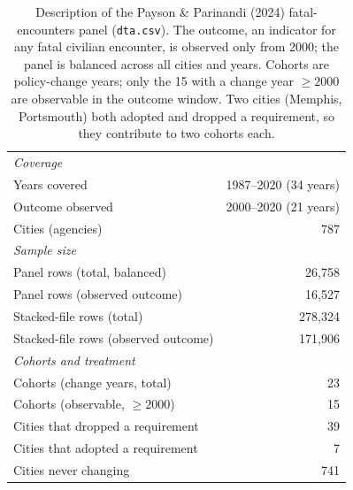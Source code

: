 \begin{table}[t]\centering
\caption{Description of the Payson \& Parinandi (2024) fatal-encounters panel
(\texttt{dta.csv}). The outcome, an indicator for any fatal civilian encounter,
is observed only from 2000; the panel is balanced across all cities and years.
Cohorts are policy-change years; only the 15 with a change year $\ge 2000$ are
observable in the outcome window. Two cities (Memphis, Portsmouth) both adopted
and dropped a requirement, so they contribute to two cohorts each.}
\label{tab:data-description}
\begin{tabular}{lr}
\toprule
\multicolumn{2}{l}{\textit{Coverage}} \\
\quad Years covered & 1987--2020 (34 years) \\
\quad Outcome observed & 2000--2020 (21 years) \\
\quad Cities (agencies) & 787 \\
\midrule
\multicolumn{2}{l}{\textit{Sample size}} \\
\quad Panel rows (total, balanced) & 26,758 \\
\quad Panel rows (observed outcome) & 16,527 \\
\quad Stacked-file rows (total) & 278,324 \\
\quad Stacked-file rows (observed outcome) & 171,906 \\
\midrule
\multicolumn{2}{l}{\textit{Cohorts and treatment}} \\
\quad Cohorts (change years, total) & 23 \\
\quad Cohorts (observable, $\ge 2000$) & 15 \\
\quad Cities that dropped a requirement & 39 \\
\quad Cities that adopted a requirement & 7 \\
\quad Cities never changing & 741 \\
\bottomrule
\end{tabular}
\end{table}
